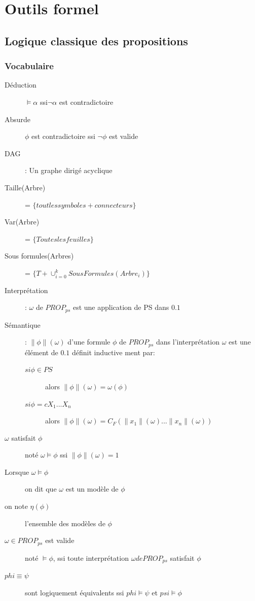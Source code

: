 \part{Outils formel}
\pagebreak

\chapter{Logique classique des propositions}
\section{Vocabulaire}

\begin{description}
\item[Déduction] $\models \alpha$ ssi$ \neg \alpha$ est contradictoire
\item[Absurde] $\phi$ est contradictoire ssi $\neg \phi$ est valide
\item[DAG]: Un graphe dirigé acyclique
\item[Taille(Arbre)] = $\{ tout les symboles + connecteurs \}$
\item[Var(Arbre)] = $\{ Toutes les feuilles \}$
\item[Sous formules(Arbres)] = $\{ T + \cup_{i=0}^k SousFormules(Arbre_i) \}$
\item[Interprétation]: $\omega$ de $PROP_{ps}$ est une application de PS dans ${0.1}$
\item[Sémantique]: $\|  \phi \| (\omega)$ d'une formule $\phi$ de $PROP_{ps}$ dans l'interprétation $\omega$ est une élément de ${0.1}$ définit inductive ment par:
\begin{description}
\item[$si \phi \in PS$] alors $\| \phi \| (\omega) = \omega(\phi)$
\item[$si \phi = cX_1 ... X_n$] alors $\| \phi \|(\omega) = C_F(\| x_1 \| (\omega) ... \| x_n \|(\omega))$
\end{description}
\item[$\omega $ satisfait $ \phi$] noté $\omega \models \phi $ ssi $ \| \phi \| (\omega) = 1$
\item[Lorsque $\omega \models \phi$] on dit que $\omega$ est un modèle de $\phi$
\item[on note $\eta(\phi)$] l'ensemble des modèles de $\phi$
\item[$\omega \in PROP_{ps}$ est valide] noté $\models \phi$, ssi toute interprétation $ \omega de PROP_{ps}$ satisfait $ \phi$
\item[$phi \equiv \psi$] sont logiquement équivalents ssi $ phi \models \psi$ et $psi \models \phi$
\end{description}

